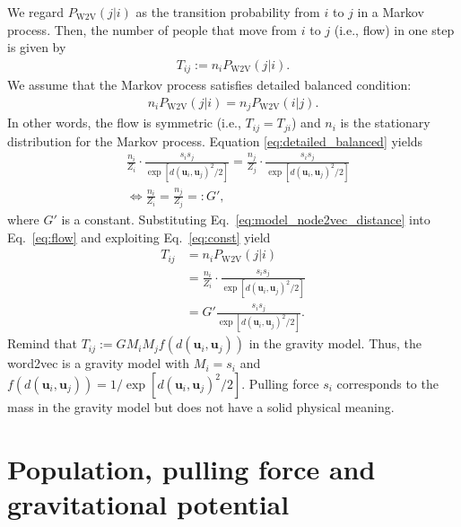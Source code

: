 \documentclass[12pt]{article} %
\def\vec#1{{\bm #1}}
\begin{document}
We regard $P_{\text{W2V}}(j \vert i)$ as the transition probability from $i$ to $j$ in a Markov process.
Then, the number of people that move from $i$ to $j$ (i.e., flow) in one step is given by 
\begin{align}
    \label{eq:flow}
    T_{ij}:= n_i P_{\text{W2V}}(j \vert i).
\end{align}
We assume that the Markov process satisfies detailed balanced condition:  
\begin{align}
    \label{eq:detailed_balanced}
    n_i P_{\text{W2V}}\left(j \vert i \right) = n_j P_{\text{W2V}}\left(i \vert j \right).
\end{align}
In other words, the flow is symmetric (i.e., $T_{ij} = T_{ji}$) and $n_i$ is the stationary distribution for the Markov process.
Equation \eqref{eq:detailed_balanced} yields 
\begin{align}
    &\frac{n_i}{Z_i}\cdot \frac{s_i s_j}{\exp\left[d\left(\vec{u}_i, \vec{u}_j\right)^2 / 2\right]} = \frac{n_j}{Z_j}\cdot \frac{s_i s_j}{\exp\left[d\left(\vec{u}_i, \vec{u}_j\right)^2 / 2 \right]} \\
    &\iff \frac{n_i}{Z_i} = \frac{n_j}{Z_j} =: G', \label{eq:const}
\end{align}
where $G'$ is a constant. 
Substituting Eq.~\eqref{eq:model_node2vec_distance} into Eq.~\eqref{eq:flow} and exploiting Eq.~\eqref{eq:const} yield 
\begin{align}
    \label{eq:flow_gravity_model}
    T_{ij} &= n_i P_{\text{W2V}}\left(j \vert i \right)\nonumber \\
           &= \frac{n_i}{Z_i} \cdot \frac{s_i s_j}{\exp\left[d\left(\vec{u}_i, \vec{u}_j\right)^2 / 2 \right]}\nonumber \\ 
           &= G' \frac{s_i s_j}{\exp\left[d\left(\vec{u}_i, \vec{u}_j\right)^2 / 2 \right]}. 
\end{align}
Remind that $T_{ij}:= G M_i M_j f\left(d\left(\vec{u}_i,\vec{u}_j\right)\right)$ in the gravity model.
Thus, the word2vec is a gravity model with $M_i=s_i$ and $f\left(d\left(\vec{u}_i,\vec{u}_j\right)\right) = 1/\exp\left[d\left(\vec{u}_i,\vec{u}_j\right) ^ 2 /2\right]$.
Pulling force $s_i$ corresponds to the mass in the gravity model but does not have a solid physical meaning.

\section{Population, pulling force and gravitational potential}
\end{document}
